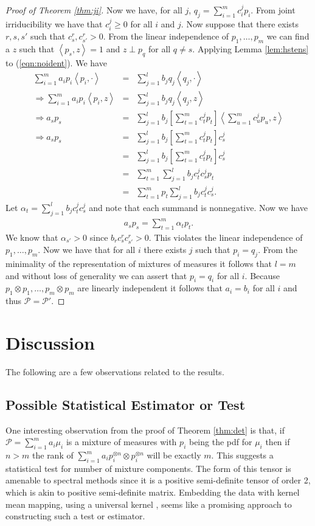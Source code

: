 \documentclass[aos]{imsart}
\def\l{\left}
\def\r{\right}
\def\sP{\mathscr{P}}
\theoremstyle{plain}
\theoremstyle{defintion}
\begin{document}
\begin{proof}[Proof of Theorem \ref{thm:ji}]
		Now we have, for all $j$, $q_j = \sum_{i=1}^m c_i^j p_i$. From joint irriducibility we have that $c_i^j \ge 0$ for all $i$ and $j$. Now suppose that there exists $r,s,s'$ such that $c_s^r,c_{s'}^r >0$. From the linear independence of $p_1,\ldots,p_m$ we can find a $z$ such that $\l<p_s,z\r> = 1$ and $z\perp p_q$ for all $q\neq s$. Applying Lemma \ref{lem:hstens} to (\ref{eqn:noident}). We have
		\begin{eqnarray*}
			\sum_{i=1}^m  a_i p_i \l< p_i, \cdot \r> &=& \sum_{j=1}^l  b_j q_j \l<q_j,\cdot\r>\\
			\Rightarrow \sum_{i=1}^m  a_i p_i \l< p_i, z \r> &=& \sum_{j=1}^l  b_j q_j \l<q_j,z\r>\\
			\Rightarrow  a_s p_s  &=& \sum_{j=1}^l  b_j \l[\sum_{t=1}^m c_t^j p_t\r] \l<\sum_{u=1}^m c_u^j p_u,z\r>\\
			\Rightarrow  a_s p_s  &=& \sum_{j=1}^l  b_j \l[\sum_{t=1}^m c_t^j p_t\r] c_s^j\\
			&=& \sum_{j=1}^l  b_j \l[\sum_{t=1}^m c_t^j p_t\r] c_s^j\\
			&=&    \sum_{t=1}^m \sum_{j=1}^l b_jc_t^j c_s^j p_t \\
			&=&    \sum_{t=1}^m p_t \sum_{j=1}^l b_jc_t^j c_s^j. 
		\end{eqnarray*}
		Let $\alpha_t = \sum_{j=1}^l b_jc_t^j c_s^j$ and note that each summand is nonnegative. Now we have
		\begin{eqnarray*}
			a_s p_s = \sum_{t=1}^m \alpha_t p_t.
		\end{eqnarray*}
		We know that $\alpha_{s'}>0$ since $b_r c_s^r c_{s'}^r >0$. This violates the linear independence of $p_1,\ldots,p_m$. Now we have that for all $i$ there exists $j$ such that $p_i = q_j$. From the minimality of the representation of mixtures of measures it follows that $l=m$ and without loss of generality we can assert that $p_i = q_i$ for all $i$. Because $p_1 \otimes p_1, \ldots, p_m \otimes p_m$ are linearly independent it follows that $a_i = b_i$ for all $i$ and thus $\sP = \sP'$.

	\end{proof}

	\section{Discussion}
	The following are a few observations related to the results.
	\subsection{Possible Statistical Estimator or Test}
	One interesting observation from the proof of Theorem \ref{thm:det} is that, if $\sP= \sum_{i=1}^{m}  a_i \mu_i$ is a mixture of measures with $p_i$ being the pdf for $\mu_i$ then if $n>m$ the rank of $\sum_{i=1}^m a_i p_i^{\otimes n} \otimes p_i^{\otimes n}$ will be exactly $m$. This suggests a statistical test for number of mixture components. The form of this tensor is amenable to spectral methods since it is a positive semi-definite tensor of order 2, which is akin to positive semi-definite matrix. Embedding the data with kernel mean mapping, using a universal kernel \cite{micchelli06}, seems like a promising approach to constructing such a test or estimator.
\end{document}
